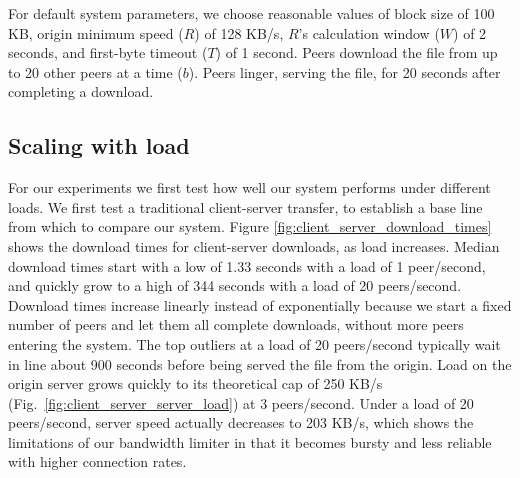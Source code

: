 For default system parameters, we choose reasonable values 
of block size of 100 KB, origin minimum speed ($R$) of 128 KB/s, $R$'s calculation window ($W$) 
of 2 seconds, and first-byte timeout ($T$) of 1 second.  Peers download the file from up to 20 other peers at a time ($b$).
Peers linger, serving the file, for 20 seconds after completing a download.

\subsection{Scaling with load}

For our experiments we first test how well our system performs under different loads.
We first test a traditional client-server transfer, to establish a base line from which to compare 
our system. Figure \ref{fig:client_server_download_times} shows the download times for client-server 
downloads, as load increases.  Median download times start with a low of 1.33 seconds with a load of 1 peer/second,
and quickly grow to a high of 344 seconds with a load of 20 peers/second. Download times increase linearly instead 
of exponentially because we start a fixed number of peers and let them all complete downloads, without more peers
entering the system. 
The top outliers at a load of 20 peers/second typically wait in line about 900 seconds before 
being served the file from the origin. Load on the origin server grows quickly to its 
theoretical cap of 250 KB/s (Fig.~\ref{fig:client_server_server_load}) 
at 3 peers/second. Under a load of 20 peers/second, server speed actually decreases to 203 KB/s, which 
shows the limitations of our bandwidth limiter in that it becomes bursty and less reliable with higher connection rates. 

